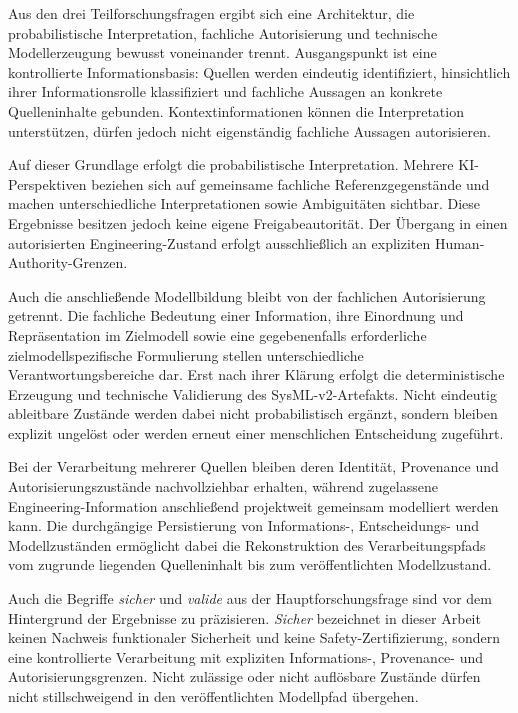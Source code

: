 Aus den drei Teilforschungsfragen ergibt sich eine Architektur, die
probabilistische Interpretation, fachliche Autorisierung und technische
Modellerzeugung bewusst voneinander trennt. Ausgangspunkt ist eine
kontrollierte Informationsbasis: Quellen werden eindeutig identifiziert,
hinsichtlich ihrer Informationsrolle klassifiziert und fachliche Aussagen an
konkrete Quelleninhalte gebunden. Kontextinformationen können die
Interpretation unterstützen, dürfen jedoch nicht eigenständig fachliche
Aussagen autorisieren.

Auf dieser Grundlage erfolgt die probabilistische Interpretation. Mehrere
KI-Perspektiven beziehen sich auf gemeinsame fachliche Referenzgegenstände und
machen unterschiedliche Interpretationen sowie Ambiguitäten sichtbar. Diese
Ergebnisse besitzen jedoch keine eigene Freigabeautorität. Der Übergang in
einen autorisierten Engineering-Zustand erfolgt ausschließlich an expliziten
Human-Authority-Grenzen.

Auch die anschließende Modellbildung bleibt von der fachlichen Autorisierung
getrennt. Die fachliche Bedeutung einer Information, ihre Einordnung und
Repräsentation im Zielmodell sowie eine gegebenenfalls erforderliche
zielmodellspezifische Formulierung stellen unterschiedliche
Verantwortungsbereiche dar. Erst nach ihrer Klärung erfolgt die
deterministische Erzeugung und technische Validierung des SysML-v2-Artefakts.
Nicht eindeutig ableitbare Zustände werden dabei nicht probabilistisch
ergänzt, sondern bleiben explizit ungelöst oder werden erneut einer
menschlichen Entscheidung zugeführt.

Bei der Verarbeitung mehrerer Quellen bleiben deren Identität, Provenance und
Autorisierungszustände nachvollziehbar erhalten, während zugelassene
Engineering-Information anschließend projektweit gemeinsam modelliert werden
kann. Die durchgängige Persistierung von Informations-, Entscheidungs- und
Modellzuständen ermöglicht dabei die Rekonstruktion des Verarbeitungspfads
vom zugrunde liegenden Quelleninhalt bis zum veröffentlichten Modellzustand.

Auch die Begriffe \emph{sicher} und \emph{valide} aus der
Hauptforschungsfrage sind vor dem Hintergrund der Ergebnisse zu präzisieren.
\emph{Sicher} bezeichnet in dieser Arbeit keinen Nachweis funktionaler
Sicherheit und keine Safety-Zertifizierung, sondern eine kontrollierte
Verarbeitung mit expliziten Informations-, Provenance- und
Autorisierungsgrenzen. Nicht zulässige oder nicht auflösbare Zustände dürfen
nicht stillschweigend in den veröffentlichten Modellpfad übergehen.

